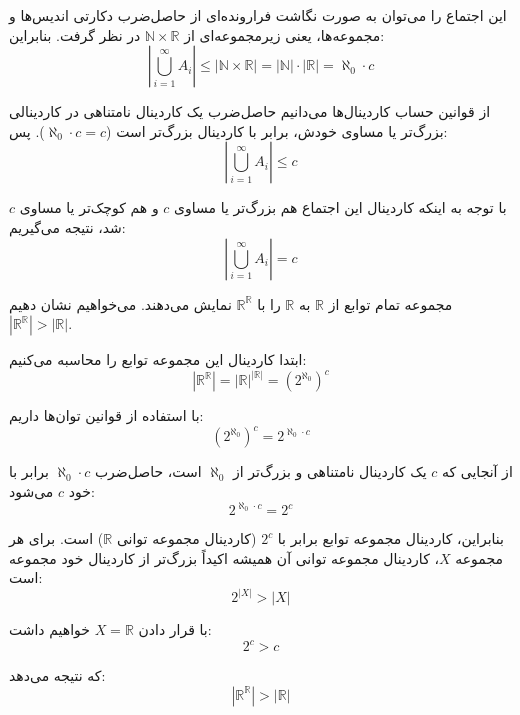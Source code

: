  این اجتماع را می‌توان به صورت نگاشت فرارونده‌ای از حاصل‌ضرب دکارتی اندیس‌ها و مجموعه‌ها، یعنی زیرمجموعه‌ای از $\mathbb{N} \times \mathbb{R}$ در نظر گرفت. بنابراین:
    \[ \left| \bigcup_{i=1}^{\infty} A_i \right| \le |\mathbb{N} \times \mathbb{R}| = |\mathbb{N}| \cdot |\mathbb{R}| = \aleph_0 \cdot c \]
    
    از قوانین حساب کاردینال‌ها می‌دانیم حاصل‌ضرب یک کاردینال نامتناهی در کاردینالی بزرگ‌تر یا مساوی خودش، برابر با کاردینال بزرگ‌تر است ($\aleph_0 \cdot c = c$). پس:
    \[ \left| \bigcup_{i=1}^{\infty} A_i \right| \le c \]

با توجه به اینکه کاردینال این اجتماع هم بزرگ‌تر یا مساوی $c$ و هم کوچک‌تر یا مساوی $c$ شد، نتیجه می‌گیریم:
\[ \left| \bigcup_{i=1}^{\infty} A_i \right| = c \]


مجموعه تمام توابع از $\mathbb{R}$ به $\mathbb{R}$ را با $\mathbb{R}^\mathbb{R}$ نمایش می‌دهند. می‌خواهیم نشان دهیم $|\mathbb{R}^\mathbb{R}| > |\mathbb{R}|$.

ابتدا کاردینال این مجموعه توابع را محاسبه می‌کنیم:
\[ |\mathbb{R}^\mathbb{R}| = |\mathbb{R}|^{|\mathbb{R}|} = (2^{\aleph_0})^{c} \]

با استفاده از قوانین توان‌ها داریم:
\[ (2^{\aleph_0})^{c} = 2^{\aleph_0 \cdot c} \]

از آنجایی که $c$ یک کاردینال نامتناهی و بزرگ‌تر از $\aleph_0$ است، حاصل‌ضرب $\aleph_0 \cdot c$ برابر با خود $c$ می‌شود:
\[ 2^{\aleph_0 \cdot c} = 2^c \]

بنابراین، کاردینال مجموعه توابع برابر با $2^c$ (کاردینال مجموعه توانی $\mathbb{R}$) است. برای هر مجموعه $X$، کاردینال مجموعه توانی آن همیشه اکیداً بزرگ‌تر از کاردینال خود مجموعه است:
\[ 2^{|X|} > |X| \]

با قرار دادن $X = \mathbb{R}$ خواهیم داشت:
\[ 2^c > c \]

که نتیجه می‌دهد:
\[ |\mathbb{R}^\mathbb{R}| > |\mathbb{R}| \]
